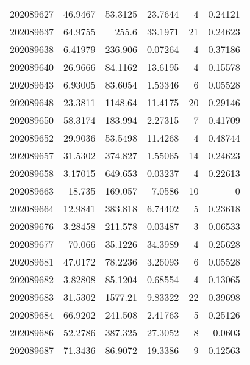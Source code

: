 \begin{tabular}{rrrrrr}
 202089627 &         46.9467  &       53.3125 &           23.7644  &           4 & 0.24121 \\
 202089637 &         64.9755  &      255.6    &           33.1971  &          21 & 0.24623 \\
 202089638 &          6.41979 &      236.906  &            0.07264 &           4 & 0.37186 \\
 202089640 &         26.9666  &       84.1162 &           13.6195  &           4 & 0.15578 \\
 202089643 &          6.93005 &       83.6054 &            1.53346 &           6 & 0.05528 \\
 202089648 &         23.3811  &     1148.64   &           11.4175  &          20 & 0.29146 \\
 202089650 &         58.3174  &      183.994  &            2.27315 &           7 & 0.41709 \\
 202089652 &         29.9036  &       53.5498 &           11.4268  &           4 & 0.48744 \\
 202089657 &         31.5302  &      374.827  &            1.55065 &          14 & 0.24623 \\
 202089658 &          3.17015 &      649.653  &            0.03237 &           4 & 0.22613 \\
 202089663 &         18.735   &      169.057  &            7.0586  &          10 & 0       \\
 202089664 &         12.9841  &      383.818  &            6.74402 &           5 & 0.23618 \\
 202089676 &          3.28458 &      211.578  &            0.03487 &           3 & 0.06533 \\
 202089677 &         70.066   &       35.1226 &           34.3989  &           4 & 0.25628 \\
 202089681 &         47.0172  &       78.2236 &            3.26093 &           6 & 0.05528 \\
 202089682 &          3.82808 &       85.1204 &            0.68554 &           4 & 0.13065 \\
 202089683 &         31.5302  &     1577.21   &            9.83322 &          22 & 0.39698 \\
 202089684 &         66.9202  &      241.508  &            2.41763 &           5 & 0.25126 \\
 202089686 &         52.2786  &      387.325  &           27.3052  &           8 & 0.0603  \\
 202089687 &         71.3436  &       86.9072 &           19.3386  &           9 & 0.12563 \\

\end{tabular}
